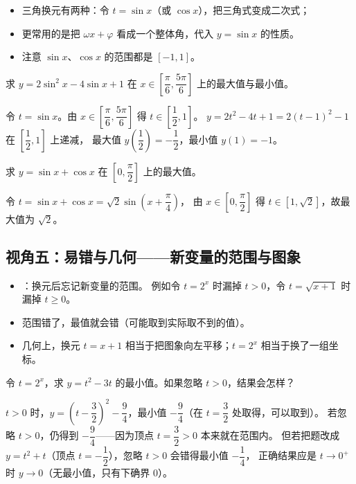 \begin{explore}
\begin{itemize}
  \item 三角换元有两种：令 $t=\sin x$（或 $\cos x$），把三角式变成二次式；
  \item 更常用的是把 $\omega x+\varphi$ 看成一个整体角，代入 $y=\sin x$ 的性质。
  \item 注意 $\sin x$、$\cos x$ 的范围都是 $[-1,1]$。
\end{itemize}

\begin{example}
求 $y=2\sin^2 x-4\sin x+1$ 在 $x\in\left[\dfrac{\pi}{6},\dfrac{5\pi}{6}\right]$ 上的最大值与最小值。
\end{example}
\begin{solution}
令 $t=\sin x$。由 $x\in\left[\dfrac{\pi}{6},\dfrac{5\pi}{6}\right]$ 得 $t\in\left[\dfrac12,1\right]$。
$y=2t^2-4t+1=2(t-1)^2-1$ 在 $\left[\dfrac12,1\right]$ 上递减，
最大值 $y\left(\dfrac12\right)=-\dfrac12$，最小值 $y(1)=-1$。
\end{solution}

\begin{problem}
求 $y=\sin x+\cos x$ 在 $\left[0,\dfrac{\pi}{2}\right]$ 上的最大值。
\end{problem}
\begin{solution}
令 $t=\sin x+\cos x=\sqrt2\sin\left(x+\dfrac{\pi}{4}\right)$，
由 $x\in\left[0,\dfrac{\pi}{2}\right]$ 得 $t\in[1,\sqrt2]$，故最大值为 $\sqrt2$。
\end{solution}

\subsection{视角五：易错与几何——新变量的范围与图象}

\begin{itemize}
  \item {}：换元后忘记新变量的范围。
        例如令 $t=2^x$ 时漏掉 $t>0$，令 $t=\sqrt{x+1}$ 时漏掉 $t\geq0$。
  \item 范围错了，最值就会错（可能取到实际取不到的值）。
  \item 几何上，换元 $t=x+1$ 相当于把图象向左平移；$t=2^x$ 相当于换了一组坐标。
\end{itemize}

\begin{example}
令 $t=2^x$，求 $y=t^2-3t$ 的最小值。如果忽略 $t>0$，结果会怎样？
\end{example}
\begin{solution}
$t>0$ 时，$y=\left(t-\dfrac32\right)^2-\dfrac94$，最小值 $-\dfrac94$（在 $t=\dfrac32$ 处取得，可以取到）。
若忽略 $t>0$，仍得到 $-\dfrac94$——因为顶点 $t=\dfrac32>0$ 本来就在范围内。
但若把题改成 $y=t^2+t$（顶点 $t=-\dfrac12$），忽略 $t>0$ 会错得最小值 $-\dfrac14$，
正确结果应是 $t\to0^+$ 时 $y\to0$（无最小值，只有下确界 $0$）。
\end{solution}


\end{explore}
